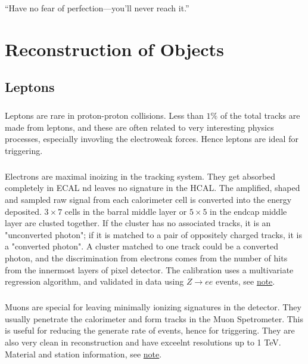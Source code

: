 \begin{savequote}[75mm]
“Have no fear of perfection—you’ll never reach it.”
\end{savequote}

\chapter{Reconstruction of Objects}

\section{Leptons}
\paragraph{}
Leptons are rare in proton-proton collisions. Less than $1\%$ of the total tracks are made from leptons, and these are often related to very interesting physics processes, especially invovling the electroweak forces. Hence leptons are ideal for triggering.

\paragraph{}
Electrons are maximal inoizing in the tracking system. They get absorbed completely in ECAL nd leaves no signature in the HCAL. The amplified, shaped and sampled raw signal from each calorimeter cell is converted into the energy deposited. $3\times 7$ cells in the barral middle layer or $ 5 \times 5$ in the endcap middle layer are clusted together. If the cluster has no associated tracks, it is an "unconverted photon"; if it is matched to a pair of oppositely charged tracks, it is a "converted photon". A cluster matched to one track could be a converted photon, and the discrimination from electrons comes from the number of hits from the innermost layers of pixel detector. The calibration uses a multivariate regression algorithm, and validated in data using $Z \to ee$ events, see \href{https://atlas.web.cern.ch/Atlas/GROUPS/PHYSICS/PUBNOTES/ATL-PHYS-PUB-2016-015/}{note}.

\paragraph{}
Muons are special for leaving minimally ionizing signatures in the detector. They usually penetrate the calorimeter and form tracks in the Muon Spetrometer. This is useful for reducing the generate rate of events, hence for triggering. They are also very clean in reconstruction and have exceelnt resolutions up to 1 TeV. Material and station information, see \href{https://cds.cern.ch/record/2252613/files/ATL-COM-MUON-2017-005.pdf}{note}.

